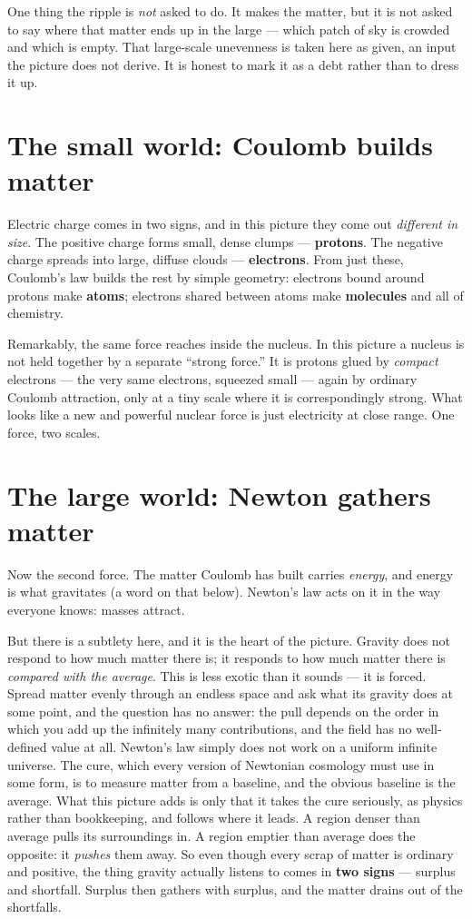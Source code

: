 \documentclass[11pt]{article}
\begin{document}
One thing the ripple is \emph{not} asked to do. It makes the matter, but it is not asked to say where that matter
ends up in the large --- which patch of sky is crowded and which is empty. That large-scale unevenness is taken
here as given, an input the picture does not derive. It is honest to mark it as a debt rather than to dress it up.

\section*{The small world: Coulomb builds matter}
Electric charge comes in two signs, and in this picture they come out \emph{different in size}. The positive
charge forms small, dense clumps --- \textbf{protons}. The negative charge spreads into large, diffuse clouds ---
\textbf{electrons}. From just these, Coulomb's law builds the rest by simple geometry: electrons bound around
protons make \textbf{atoms}; electrons shared between atoms make \textbf{molecules} and all of chemistry.

Remarkably, the same force reaches inside the nucleus. In this picture a nucleus is not held together by a separate
``strong force.'' It is protons glued by \emph{compact} electrons --- the very same electrons, squeezed small ---
again by ordinary Coulomb attraction, only at a tiny scale where it is correspondingly strong. What looks like a
new and powerful nuclear force is just electricity at close range. One force, two scales.

\section*{The large world: Newton gathers matter}
Now the second force. The matter Coulomb has built carries \emph{energy}, and energy is what gravitates (a word on
that below). Newton's law acts on it in the way everyone knows: masses attract.

But there is a subtlety here, and it is the heart of the picture. Gravity does not respond to how much matter
there is; it responds to how much matter there is \emph{compared with the average}. This is less exotic than it
sounds --- it is forced. Spread matter evenly through an endless space and ask what its gravity does at some point,
and the question has no answer: the pull depends on the order in which you add up the infinitely many contributions,
and the field has no well-defined value at all. Newton's law simply does not work on a uniform infinite universe.
The cure, which every version of Newtonian cosmology must use in some form, is to measure matter from a baseline,
and the obvious baseline is the average. What this picture adds is only that it takes the cure seriously, as
physics rather than bookkeeping, and follows where it leads. A region denser than average
pulls its surroundings in. A region emptier than average does the opposite: it \emph{pushes} them away. So even
though every scrap of matter is ordinary and positive, the thing gravity actually listens to comes in \textbf{two
signs} --- surplus and shortfall. Surplus then gathers with surplus, and the matter drains out of the shortfalls.
\end{document}
